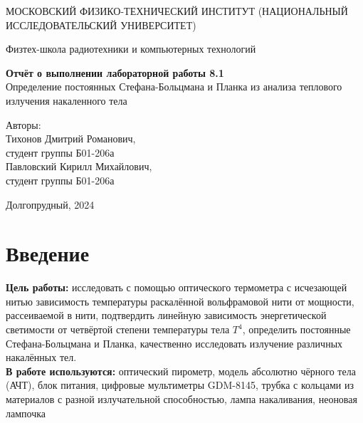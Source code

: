 \documentclass[a4paper, 12pt]{article}
\begin{document}
    \begin{titlepage}
	\begin{center}
            {\large МОСКОВСКИЙ ФИЗИКО-ТЕХНИЧЕСКИЙ ИНСТИТУТ (НАЦИОНАЛЬНЫЙ ИССЛЕДОВАТЕЛЬСКИЙ УНИВЕРСИТЕТ)}
	\end{center}
 
	\begin{center}
		{\large Физтех-школа радиотехники и компьютерных технологий}
	\end{center}
	
	\vspace{8cm}
	{\LARGE
		\begin{center}
                {\bf Отчёт о выполнении лабораторной работы 8.1}\\
                Определение постоянных Стефана-Больцмана и Планка из анализа теплового излучения накаленного тела
		\end{center}
	}
	\vspace{4cm}
	\begin{flushright}
		{\Large Авторы: \\ 
        Тихонов Дмитрий Романович, \\ студент группы Б01-206а \\
        Павловский Кирилл Михайлович, \\ студент группы Б01-206а}
	\end{flushright}
	\vspace{4cm}
	\begin{center}
		\Large Долгопрудный, 2024
	\end{center}
    \end{titlepage}


    \section{Введение}

    \noindent \textbf{Цель работы:} исследовать с помощью оптического термометра с исчезающей нитью зависимость температуры раскалённой вольфрамовой нити от мощности, рассеиваемой в нити, подтвердить линейную зависимость энергетической светимости от четвёртой степени температуры тела $T^4$, определить постоянные Стефана-Больцмана и Планка, качественно исследовать излучение различных накалённых тел. \\

    \noindent \textbf{В работе используются:} оптический пирометр, модель абсолютно чёрного тела (АЧТ), блок питания, цифровые мультиметры GDM-8145, трубка с кольцами из материалов с разной излучательной способностью, лампа накаливания, неоновая лампочка
    
\end{document}
